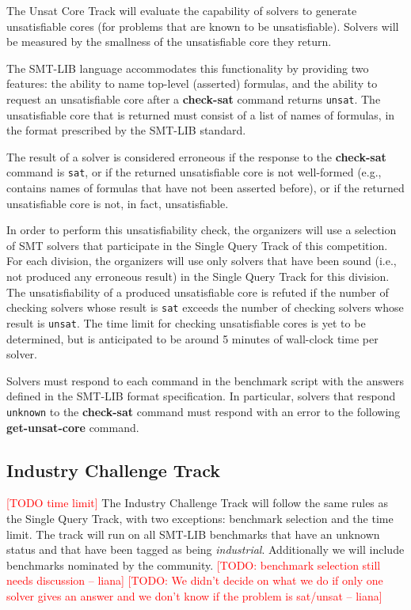 \documentclass[12pt]{article}
\newcommand{\akey}[1]{\textbf{#1}}
\newcommand{\rem}[1]{\textcolor{red}{[#1]}}
\newcommand{\todo}[1]{\rem{TODO #1}}
\newcommand{\lh}[1]{\rem{#1 -- liana}}
\newcommand{\main}{Single Query\xspace}
\newcommand{\ucore}{Unsat Core\xspace}
\newcommand{\challenge}{Industry Challenge\xspace}
\begin{document}
The \ucore Track will evaluate the capability of solvers to
generate unsatisfiable cores (for problems that are known to be
unsatisfiable).  Solvers will be measured by the smallness of the
unsatisfiable core they return.

The SMT-LIB language accommodates this functionality by providing two
features: the ability to name top-level (asserted) formulas, and the
ability to request an unsatisfiable core after a \akey{check-sat}
command returns \texttt{unsat}.  The unsatisfiable core that is
returned must consist of a list of names of formulas, in the format
prescribed by the SMT-LIB standard.

The result of a solver is considered erroneous if the response to the
\akey{check-sat} command is \texttt{sat}, or if the returned
unsatisfiable core is not well-formed (e.g., contains names of
formulas that have not been asserted before), or if the returned
unsatisfiable core is not, in fact, unsatisfiable.

In order to perform this unsatisfiability check, the organizers will use a
selection of SMT solvers that participate in the \main Track of this
competition.  For each division, the organizers will use only solvers that have
been sound (i.e., not produced any erroneous result) in the \main Track for
this division.  The unsatisfiability of a produced unsatisfiable core is
refuted if the number of checking solvers whose result is \texttt{sat} exceeds
the number of checking solvers whose result is \texttt{unsat}.  The time limit
for checking unsatisfiable cores is yet to be determined, but is anticipated to
be around 5 minutes of wall-clock time per solver.

Solvers must respond to each command in the benchmark script with the
answers defined in the SMT-LIB format specification.  In particular,
solvers that respond \texttt{unknown} to the \akey{check-sat} command
must respond with an error to the following \akey{get-unsat-core}
command.

\subsection{\challenge Track}
\label{sec:exec:industry-challenge}

\todo{time limit}
The \challenge Track will follow the same rules as the \main Track,
with two exceptions: benchmark selection and the time limit. The track will run on
all SMT-LIB benchmarks that have an unknown status and that have been tagged as being
 \emph{industrial}. Additionally we will include benchmarks nominated by the community.
\lh{TODO: benchmark selection still needs discussion}
\lh{TODO: We didn't decide on what we do if only one solver gives an answer and we don't
know if the problem is sat/unsat}
\end{document}
